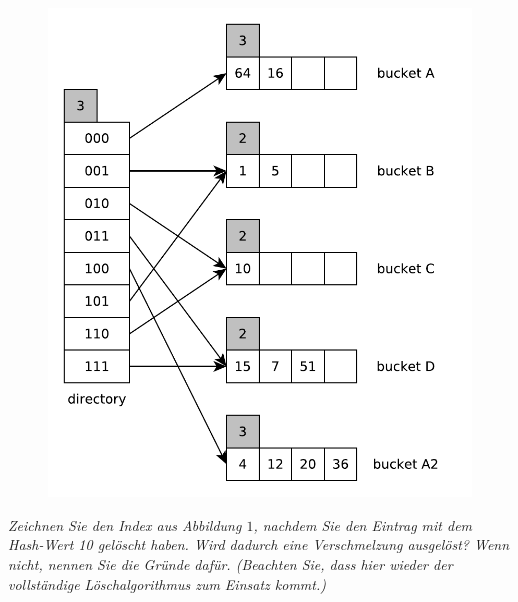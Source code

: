 \documentclass{uni_tue_template}
\begin{document}
  \begin{figure}[h!]
    \centering
    \includegraphics[scale=0.7]{graphml/01_4.pdf}
  \end{figure}
  \newpage
  \item \emph{Zeichnen Sie den Index aus Abbildung $1$, nachdem Sie den Eintrag mit dem Hash-Wert 10 gelöscht haben. Wird dadurch eine Verschmelzung ausgelöst? Wenn nicht, nennen Sie die Gründe dafür. (Beachten Sie, dass hier wieder der vollständige Löschalgorithmus zum Einsatz kommt.)}\\
\end{document}
